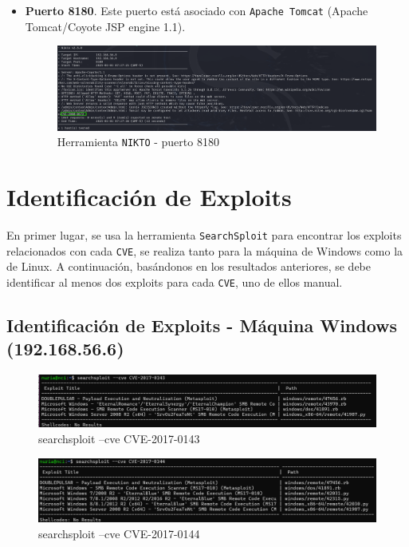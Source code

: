 \documentclass[a4paper,12pt]{article} %
\begin{document}
\begin{itemize}
        \item \textbf{Puerto 8180}. Este puerto está asociado con \texttt{Apache Tomcat} (Apache Tomcat/Coyote JSP engine 1.1). 
            \begin{figure} [hp!]
             \centering
             \includegraphics[width=1\textwidth]{imagenes/nikto8180.png}
             \caption{Herramienta \texttt{NIKTO} - puerto 8180}
             \label{fig:nikto8180}
            \end{figure}
    \end{itemize}


\newpage
\section{Identificación de Exploits}
\label{Apartado2}
En primer lugar, se usa la herramienta \texttt{SearchSploit} para encontrar los exploits relacionados con cada \texttt{CVE}, se realiza tanto para la máquina de Windows como la de Linux. A continuación,  basándonos en los resultados anteriores, se debe identificar al menos dos exploits para cada \texttt{CVE}, uno de ellos manual.

 \subsection{Identificación de Exploits - Máquina Windows (192.168.56.6)}

            \begin{figure} [hp!]
             \centering
             \includegraphics[width=1\textwidth]{imagenes/cve201743.png}
             \caption{ searchsploit --cve CVE-2017-0143}
             \label{fig:43}
            \end{figure}

            \begin{figure} [hp!]
             \centering
             \includegraphics[width=1\textwidth]{imagenes/cve201744.png}
             \caption{ searchsploit --cve CVE-2017-0144}
             \label{fig:44}
            \end{figure}
            
\end{document}
